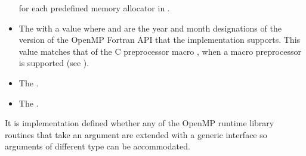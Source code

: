 \begin{fortranspecific}
\begin{itemize}
       for each predefined memory allocator 
      in .
\item The    with 
      a value  where  and  are the year 
      and month designations of the version of the OpenMP Fortran
      API that the implementation supports. This value matches that 
      of the C preprocessor macro , when a macro 
      preprocessor is supported (see ).
\item The   .
\item The   .
\end{itemize}

It is implementation defined whether any of the OpenMP runtime library 
routines that take an argument are extended with a generic interface so 
arguments of different  type can be accommodated. 
\end{fortranspecific}







